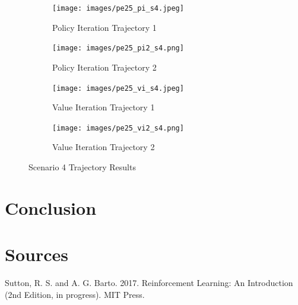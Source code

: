 \documentclass[fullpage]{article}
\begin{document}
\begin{figure}[H]
\begin{subfigure}{.5\textwidth}
\centering
\texttt{[image: images/pe25\_pi\_s4.jpeg]}
\caption{Policy Iteration Trajectory 1}
\label{fig:2a}
\end{subfigure}
\begin{subfigure}{.5\textwidth}
\centering
\texttt{[image: images/pe25\_pi2\_s4.png]}
\caption{Policy Iteration Trajectory 2}
\label{fig:2b}
\end{subfigure}
\begin{subfigure}{.5\textwidth}
\centering
\texttt{[image: images/pe25\_vi\_s4.jpeg]}
\caption{Value Iteration Trajectory 1}
\label{fig:3a}
\end{subfigure}
\begin{subfigure}{.5\textwidth}
\centering
\texttt{[image: images/pe25\_vi2\_s4.png]}
\caption{Value Iteration Trajectory 2}
\label{fig:3b}
\end{subfigure}
\caption{Scenario 4 Trajectory Results}
\end{figure}

\section{Conclusion}

\section{Sources}

Sutton, R. S. and A. G. Barto. 2017. Reinforcement Learning: An Introduction (2nd Edition, in progress). MIT Press.
\end{document}
